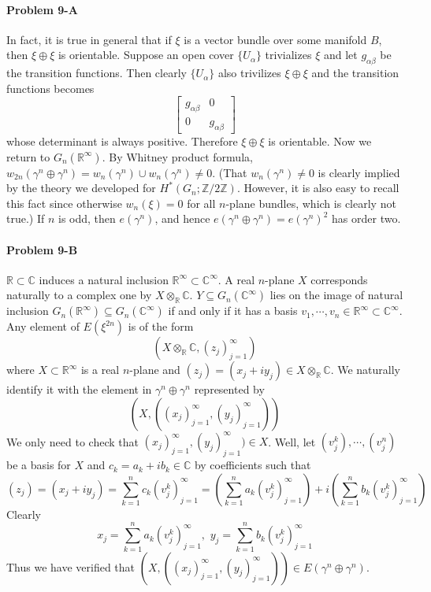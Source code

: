 \documentclass[12pt]{article}
\theoremstyle{plain}
\theoremstyle{definition}
\newcommand{\IC}{\mathbb{C}}
\newcommand{\IR}{\mathbb{R}}
\newcommand{\IZ}{\mathbb{Z}}
\newcommand\tensor{{\otimes}}
\newcommand{\<}{\langle}
\renewcommand{\>}{\rangle}
\begin{document}
\paragraph{Problem 9-A}
In fact, it is true in general that if $\xi$ is a vector bundle over some manifold $B$, then $\xi \oplus \xi$ is orientable. Suppose an open cover $\{ U_\alpha \}$ trivializes $\xi$ and let $g_{\alpha \beta}$ be the transition functions. Then clearly $\{U_\alpha\}$ also trivilizes $\xi \oplus \xi$ and the transition functions becomes 
$$ \begin{bmatrix}
g_{\alpha \beta } & 0 \\ 0 & g_{\alpha \beta} 
\end{bmatrix}$$ whose determinant is always positive. Therefore $\xi \oplus \xi$ is orientable. Now we return to $G_n(\IR^\infty)$. By Whitney product formula, $w_{2n}(\gamma^n \oplus \gamma^n) = w_n (\gamma^n) \cup w_n(\gamma^n) \neq 0$. (That $w_n(\gamma^n) \neq 0$ is clearly implied by the theory we developed for $H^*(G_n; \IZ/2\IZ)$. However, it is also easy to recall this fact since otherwise $w_n(\xi) = 0$ for all $n$-plane bundles, which is clearly not true.) If $n$ is odd, then $e(\gamma^n)$, and hence $e(\gamma^n \oplus \gamma^n) = e(\gamma^n)^2$ has order two. 

\paragraph{Problem 9-B} $\IR \subset \IC$ induces a natural inclusion $\IR^\infty \subset \IC^\infty$. A real $n$-plane $X$ corresponds naturally to a complex one by $X \tensor_\IR \IC$. $Y \subseteq G_n(\IC^\infty)$ lies on the image of natural inclusion $G_n(\IR^\infty) \subseteq G_n(\IC^\infty)$ if and only if it has a basis $v_1, \cdots, v_n \in \IR^\infty \subset \IC^\infty$.  Any element of $E(\xi^{2n})$ is of the form 
$$ (X \tensor_\IR \IC, (z_j)_{j = 1}^\infty )$$
where $X \subset \IR^\infty$ is a real $n$-plane and $(z_j) = (x_j + iy_j) \in X \tensor_\IR \IC$. We naturally identify it with the element in $\gamma^n \oplus \gamma^n$ represented by 
$$ (X, ((x_j)_{j = 1}^\infty, (y_j)_{j = 1}^\infty)) $$
We only need to check that $(x_j)_{j = 1}^\infty, (y_j)_{j = 1}^\infty) \in X$. Well, let $(v^k_j), \cdots, (v^n_j)$ be a basis for $X$ and $c_k = a_k + i b_k \in \IC$ by coefficients such that $$(z_j) = (x_j + iy_j) = \sum_{k = 1}^n c_k (v_j^k)_{j = 1}^\infty = (\sum_{k = 1}^n a_k (v_j^k)_{j = 1}^\infty) + i(\sum_{k = 1}^n b_k (v_j^k)_{j = 1}^\infty)$$
Clearly 
$$ x_j = \sum_{k = 1}^n a_k (v_j^k)_{j = 1}^\infty, \, \, y_j = \sum_{k = 1}^n b_k (v_j^k)_{j = 1}^\infty$$
Thus we have verified that $(X, ((x_j)_{j = 1}^\infty, (y_j)_{j = 1}^\infty)) \in E(\gamma^n \oplus \gamma^n)$.
\end{document}
